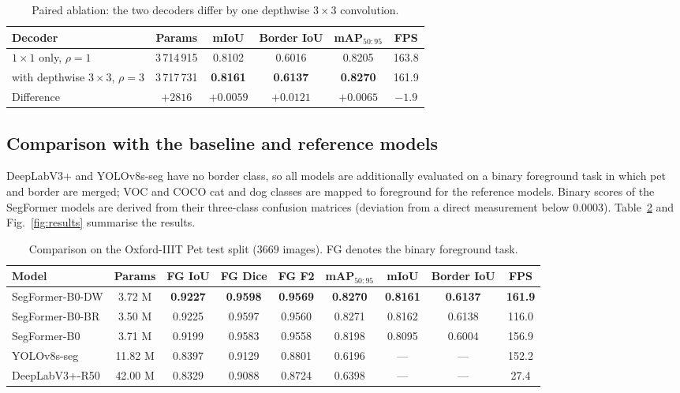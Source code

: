 \documentclass[3p,times,number]{elsarticle}
\begin{document}
\begin{table}[t]
\centering
\small
\caption{Paired ablation: the two decoders differ by one depthwise $3 \times 3$
convolution.}
\label{tab:ablation}
\begin{tabular}{lccccc}
\toprule
\textbf{Decoder} & \textbf{Params} & \textbf{mIoU} & \textbf{Border IoU} &
\textbf{mAP$_{50:95}$} & \textbf{FPS} \\
\midrule
$1 \times 1$ only, $\rho = 1$           & 3\,714\,915 & 0.8102 & 0.6016 & 0.8205 & 163.8 \\
with depthwise $3 \times 3$, $\rho = 3$ & 3\,717\,731 & \textbf{0.8161} & \textbf{0.6137} &
\textbf{0.8270} & 161.9 \\
\midrule
Difference & $+2816$ & $+0.0059$ & $+0.0121$ & $+0.0065$ & $-1.9$ \\
\bottomrule
\end{tabular}
\end{table}

\subsection{Comparison with the baseline and reference models}

DeepLabV3+ and YOLOv8s-seg have no border class, so all models are additionally evaluated
on a binary foreground task in which pet and border are merged; VOC and COCO cat and dog
classes are mapped to foreground for the reference models. Binary scores of the SegFormer
models are derived from their three-class confusion matrices (deviation from a direct
measurement below $0.0003$). Table~\ref{tab:main} and Fig.~\ref{fig:results} summarise the
results.

\begin{table}[t]
\centering
\small
\caption{Comparison on the Oxford-IIIT Pet test split ($3669$ images). FG denotes the
binary foreground task.}
\label{tab:main}
\begin{tabular}{lcccccccc}
\toprule
\textbf{Model} & \textbf{Params} & \textbf{FG IoU} & \textbf{FG Dice} & \textbf{FG F2} &
\textbf{mAP$_{50:95}$} & \textbf{mIoU} & \textbf{Border IoU} & \textbf{FPS} \\
\midrule
SegFormer-B0-DW   & 3.72 M  & \textbf{0.9227} & \textbf{0.9598} & \textbf{0.9569} &
\textbf{0.8270} & \textbf{0.8161} & \textbf{0.6137} & \textbf{161.9} \\
SegFormer-B0-BR   & 3.50 M  & 0.9225 & 0.9597 & 0.9560 & 0.8271 & 0.8162 & 0.6138 & 116.0 \\
SegFormer-B0      & 3.71 M  & 0.9199 & 0.9583 & 0.9558 & 0.8198 & 0.8095 & 0.6004 & 156.9 \\
YOLOv8s-seg       & 11.82 M & 0.8397 & 0.9129 & 0.8801 & 0.6196 & --- & --- & 152.2 \\
DeepLabV3+-R50    & 42.00 M & 0.8329 & 0.9088 & 0.8724 & 0.6398 & --- & --- & 27.4 \\
\bottomrule
\end{tabular}
\end{table}
\end{document}
